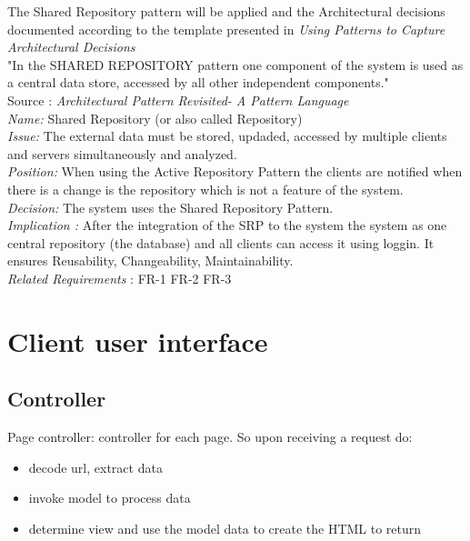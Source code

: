 The Shared Repository pattern will be applied and the Architectural decisions documented according to the template presented in \textit{Using Patterns to Capture Architectural Decisions} \\
 "In the SHARED REPOSITORY pattern one component of the system is used as a central data store, accessed by all other independent components."\\
Source : \textit{Architectural Pattern Revisited- A Pattern Language} \\
 \textit{Name:} Shared Repository (or also called Repository) \\
 \textit{Issue:} The external data must be stored, updaded, accessed by multiple clients and servers simultaneously and analyzed.\\
 \textit{Position:} When using the Active Repository Pattern the clients are notified when there is a change is the repository which is not a feature of the system.\\
 \textit{Decision: } The system uses the Shared Repository Pattern.\\
 \textit{Implication :} After the integration of the SRP to the system the system as one central repository (the database) and all clients can access it using loggin. It ensures Reusability, Changeability, Maintainability. \\
 \textit{Related Requirements} : FR-1 FR-2 FR-3 \\

 

 
\section{Client user interface}

\subsection{Controller}
Page controller: controller for each page. So upon receiving a request do:
\begin{itemize}
\item decode url, extract data
\item invoke model to process data
\item determine view and use the model data to create the HTML to return
\end{itemize}

